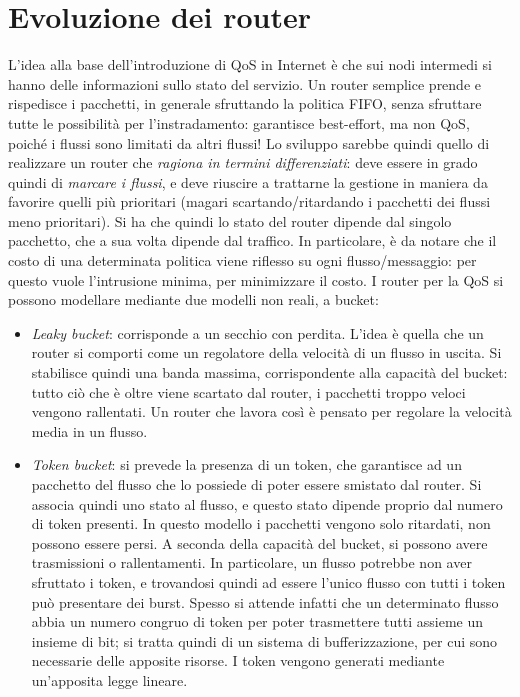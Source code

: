 \section{Evoluzione dei router}
L'idea alla base dell'introduzione di QoS in Internet è che sui nodi intermedi
si hanno delle informazioni sullo stato
del servizio. Un router semplice prende e rispedisce i pacchetti, in generale
sfruttando la politica FIFO, senza
sfruttare tutte le possibilità per l'instradamento: garantisce best-effort, ma
non QoS, poiché i flussi sono limitati
da altri flussi!
Lo sviluppo sarebbe quindi quello di realizzare un router che \textit{ragiona in
termini differenziati}: deve essere
in grado quindi di \textit{marcare i flussi}, e deve riuscire a trattarne la
gestione in maniera da favorire
quelli più prioritari (magari scartando/ritardando i pacchetti dei flussi meno
prioritari). Si ha che quindi
lo stato del router dipende dal singolo pacchetto, che a sua volta dipende dal
traffico. In particolare, è da notare
che il costo di una determinata politica viene riflesso su ogni
flusso/messaggio: per questo vuole l'intrusione minima, per minimizzare il
costo.
I router per la QoS si possono modellare mediante due modelli non reali, a
bucket:
\begin{itemize}
 \item \textit{Leaky bucket}: corrisponde a un secchio con perdita. L'idea è
quella che un router si comporti come un
 regolatore della velocità di un flusso in uscita. Si stabilisce quindi una
banda massima, corrispondente alla capacità del bucket:
 tutto ciò che è oltre viene scartato dal router, i pacchetti troppo veloci
vengono rallentati. Un router che lavora così è pensato per regolare la velocità
media in un flusso.
 \item \textit{Token bucket}: si prevede la presenza di un token, che garantisce
ad un pacchetto del flusso che lo
 possiede di poter essere smistato dal router. Si associa quindi uno stato al
flusso, e questo stato dipende proprio
 dal numero di token presenti. In questo modello i pacchetti vengono solo
ritardati, non possono essere persi.
 A seconda della capacità del bucket, si possono avere trasmissioni o
rallentamenti. In particolare, un flusso potrebbe
 non aver sfruttato i token, e trovandosi quindi ad essere l'unico flusso con
tutti i token può presentare dei burst.
 Spesso si attende infatti che un determinato flusso abbia un numero congruo di
token per poter trasmettere tutti
 assieme un insieme di bit; si tratta quindi di un sistema di bufferizzazione,
per cui sono necessarie delle apposite
 risorse. I token vengono generati mediante un'apposita legge lineare.
\end{itemize}

